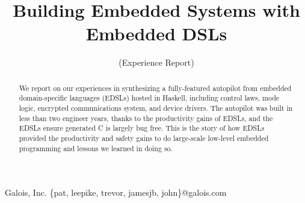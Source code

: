 \documentclass{sigplanconf}
\begin{document}
\setlength{\pdfpageheight}{\paperheight}
\setlength{\pdfpagewidth}{\paperwidth}






\title{Building Embedded Systems with Embedded DSLs}
\subtitle{(Experience Report)}

           {Galois, Inc.}
           {\{pat, leepike, trevor, jamesjb, john\}@galois.com}

\maketitle

\begin{abstract}
We report on our experiences in synthesizing a fully-featured autopilot from
embedded domain-specific languages (EDSLs) hosted in Haskell, including control
laws, mode logic, encrypted communications system, and device drivers.  The
autopilot was built in less than two engineer years, thanks to the productivity
gains of EDSLs, and the EDSLs ensure generated C is largely bug free.  This is
the story of how EDSLs provided the productivity and safety gains to do
large-scale low-level embedded programming and lessons we learned in doing so.
\end{abstract}


\end{document}
